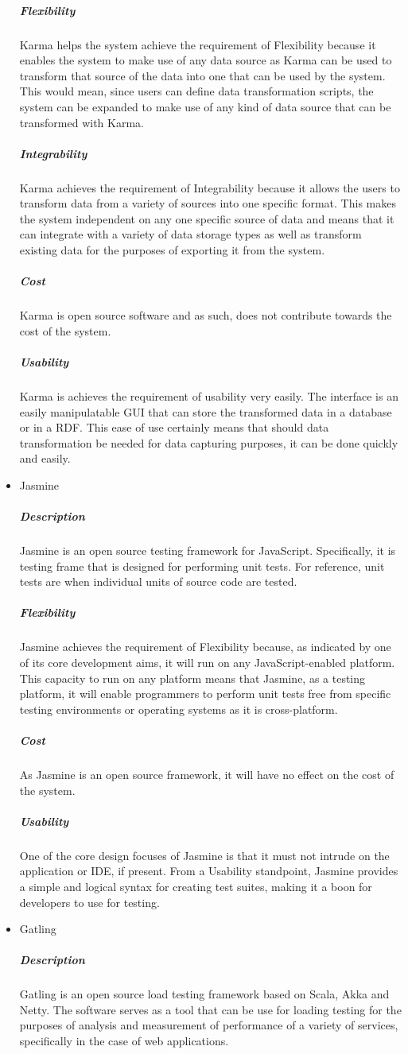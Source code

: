 \documentclass[a4paper,10pt]{article}
\begin{document}
\begin{itemize}
			\subparagraph{Flexibility}
			Karma helps the system achieve the requirement of Flexibility because it enables the system to make use of any data source as Karma can be used to transform that source of the data into one that can be used by the system. This would mean, since users can define data transformation scripts, the system can be expanded to make use of any kind of data source that can be transformed with Karma.

			\subparagraph{Integrability}
			Karma achieves the requirement of Integrability because it allows the users to transform data from a variety of sources into one specific format. This makes the system independent on any one specific source of data and means that it can integrate with a variety of data storage types as well as transform existing data for the purposes of exporting it from the system.
			\subparagraph{Cost}
			Karma is open source software and as such, does not contribute towards the cost of the system.
			\subparagraph{Usability}
			Karma is achieves the requirement of usability very easily. The interface is an easily manipulatable GUI that can store the transformed data in a database or in a RDF. This ease of use certainly means that should data transformation be needed for data capturing purposes, it can be done quickly and easily.

		\item Jasmine
			\subparagraph{Description}
			Jasmine is an open source testing framework for JavaScript. Specifically, it is testing frame that is designed for performing unit tests. For reference, unit tests are when individual units of source code are tested.

			\subparagraph{Flexibility}
			Jasmine achieves the requirement of Flexibility because, as indicated by one of its core development aims, it will run on any JavaScript-enabled platform. This capacity to run on any platform means that Jasmine, as a testing platform, it will enable programmers to perform unit tests free from specific testing environments or operating systems as it is cross-platform.

			\subparagraph{Cost}
			As Jasmine is an open source framework, it will have no effect on the cost of the system.
			\subparagraph{Usability}
			One of the core design focuses of Jasmine is that it must not intrude on the application or IDE, if present. From a Usability standpoint, Jasmine provides a simple and logical syntax for creating test suites, making it a boon for developers to use for testing.
		\item Gatling
			\subparagraph{Description}
			Gatling is an open source load testing framework based on Scala, Akka and Netty. The software serves as a tool that can be use for loading testing for the purposes of  analysis and measurement of performance of a variety of services, specifically in the case of web applications.


\end{itemize}
\end{document}
